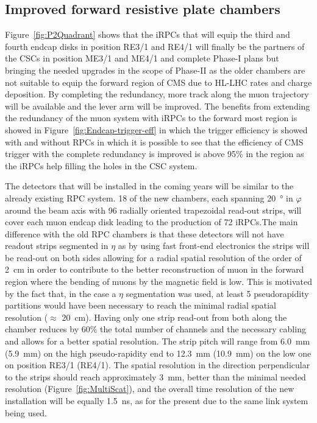 	\subsection{Improved forward resistive plate chambers}
	\label{chapt3:ssec:iRPCs}
	
	Figure~\ref{fig:P2Quadrant} shows that the iRPCs that will equip the third and fourth endcap disks in position RE3/1 and RE4/1 will finally be the partners of the CSCs in position ME3/1 and ME4/1 and complete Phase-I plans but bringing the needed upgrades in the scope of Phase-II as the older chambers are not suitable to equip the forward region of CMS due to HL-LHC rates and charge deposition. By completing the redundancy, more track along the muon trajectory will be available and the lever arm will be improved. The benefits from extending the redundancy of the muon system with iRPCs to the forward most region is showed in Figure~\ref{fig:Endcap-trigger-eff} in which the trigger efficiency is showed with and without RPCs in which it is possible to see that the efficiency of CMS trigger with the complete redundancy is improved is above 95\% in the region  as the iRPCs help filling the holes in the CSC system.
	
	The detectors that will be installed in the coming years will be similar to the already existing RPC system. 18 of the new chambers, each spanning \SI{20}{\degree} in $\varphi$ around the beam axis with 96 radially oriented trapezoidal read-out strips, will cover each muon endcap disk leading to the production of 72 iRPCs.The main difference with the old RPC chambers is that these detectors will not have readout strips segmented in $\eta$ as by using fast front-end electronics the strips will be read-out on both sides allowing for a radial spatial resolution of the order of \SI{2}{cm} in order to contribute to the better reconstruction of muon in the forward region where the bending of muons by the magnetic field is low. This is motivated by the fact that, in the case a $\eta$ segmentation was used, at least 5 pseudorapidity partitions would have been necessary to reach the minimal radial spatial resolution ($\approx$ \SI{20}{cm}). Having only one strip read-out from both along the chamber reduces by 60\% the total number of channels and the necessary cabling and allows for a better spatial resolution. The strip pitch will range from \SI{6.0}{mm} (\SI{5.9}{mm}) on the high pseudo-rapidity end to \SI{12.3}{mm} (\SI{10.9}{mm}) on the low one on position RE3/1 (RE4/1). The spatial resolution in the direction perpendicular to the strips should reach approximately \SI{3}{mm}, better than the minimal needed resolution (Figure~\ref{fig:MultiScat}), and the overall time resolution of the new installation will be equally \SI{1.5}{ns}, as for the present due to the same link system being used.

